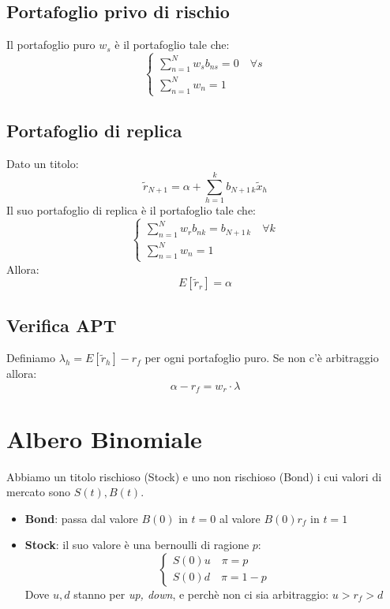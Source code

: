 \documentclass[a4paper,notitlepage]{report}%
\begin{document}
\begin{multicols*}{2}
    \subsection*{Portafoglio privo di rischio}
    Il portafoglio puro $w_s$ è il portafoglio tale che:
    \[
        \left\{\begin{array}{l}
            \sum_{n=1}^N w_s b_{ns} = 0 \quad \forall s \\
            \sum_{n=1}^N w_n  = 1
        \end{array}\right.  
    \]

    \subsection*{Portafoglio di replica}
    Dato un titolo:
    \[
        \tilde{r}_{N+1} = \alpha + \sum_{h=1}^k b_{N+1 \, k}\tilde{x}_h
    \]
    Il suo portafoglio di replica è il portafoglio tale che:
    \[
        \left\{\begin{array}{l}
            \sum_{n=1}^N w_r b_{nk} = b_{N+1 \, k} \quad \forall k\\
            \sum_{n=1}^N w_n  = 1
        \end{array}\right.  
    \]
    Allora:
    \[
        E[\tilde{r}_r] = \alpha    
    \]

    \subsection*{Verifica APT}
    Definiamo $\lambda_h = E[\tilde{r}_h]-r_f$ per ogni portafoglio puro.
    Se non c'è arbitraggio allora:
    \[
        \alpha-r_f = w_r \cdot \lambda    
    \]


\section*{Albero Binomiale}
    Abbiamo un titolo rischioso (Stock) e uno non rischioso (Bond)
    i cui valori di mercato sono $S(t), B(t)$. \\
    \begin{itemize}
        \item \textbf{Bond}: passa dal valore $B(0)$ in $t=0$ al valore $B(0)r_f$ in $t=1$
        \item \textbf{Stock}: il suo valore è una bernoulli di ragione $p$:
            \[
                \left\{\begin{array}{l}
                    S(0)u \quad \pi = p \\
                    S(0)d \quad \pi = 1-p
                \end{array}\right.
            \]
            Dove $u,d$ stanno per \textit{up, down},
            e perchè non ci sia arbitraggio: $u>r_f>d$
    \end{itemize}



\end{multicols*}
\end{document}
